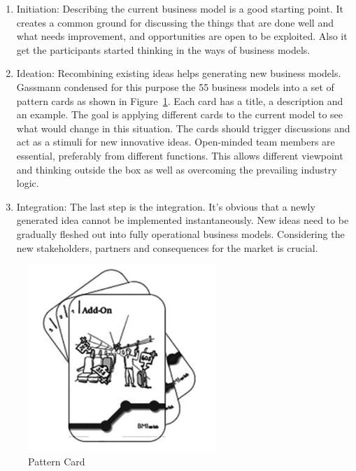 		\begin{enumerate}

					
		\item Initiation: Describing the current business model is a good starting point. It creates a common ground for discussing the things that are done well and what needs improvement, and opportunities are open to be exploited. Also it get the participants started thinking in the ways of business models.

		\item Ideation: Recombining existing ideas helps generating new business models. Gassmann condensed for this purpose the 55 business models into a set of pattern cards as shown in Figure~\ref{fig:pattern_card}. Each card has a title, a description and an example. The goal is applying different cards to the current model to see what would change in this situation. The cards should trigger discussions and act as a stimuli for new innovative ideas. Open-minded team members are essential, preferably from different functions. This allows different viewpoint and thinking outside the box as well as overcoming the prevailing industry logic.
		
		\item Integration: The last step is the integration. It's obvious that a newly generated idea cannot be implemented instantaneously. New ideas need to be gradually fleshed out into fully operational business models. Considering the new stakeholders, partners and consequences for the market is crucial.
		\end{enumerate}

		\begin{figure}[ht]
			    \begin{center}
			    \includegraphics[scale=0.6]{Talk11/Figure2.png}
			    \end{center}
			    \caption{Pattern Card \cite[p.95]{gassmann55}}
			    \label{fig:pattern_card}
			\end{figure}

